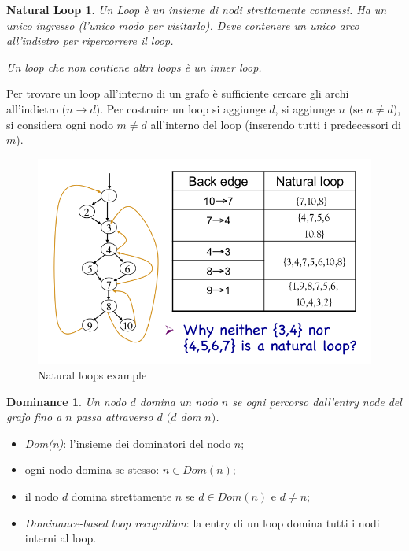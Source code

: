 \documentclass[a4paper, 11pt]{report}
\begin{document}
\newtheorem*{definit5}{Natural Loop}
\begin{definit5}
	Un Loop è un insieme di nodi strettamente connessi. Ha un unico ingresso (l'unico modo per visitarlo). Deve contenere un unico arco all'indietro per ripercorrere il loop.
	
	Un loop che non contiene altri loops è un \textit{inner loop}.
\end{definit5}
\noindent
Per trovare un loop all'interno di un grafo è sufficiente cercare gli archi all'indietro ($n\rightarrow d$).
\newline
Per costruire un loop si aggiunge $d$, si aggiunge $n$ (se $n\neq d$), si considera ogni nodo $m\neq d$ all'interno del loop (inserendo tutti i predecessori di $m$).
\newline

\begin{figure}[H]
	\centering
	\includegraphics[scale=0.27]{NaturalLoop}
	\caption{Natural loops example}
\end{figure}

\newtheorem*{definit6}{Dominance}
\begin{definit6}
	Un nodo $d$ domina un nodo $n$ se ogni percorso dall'entry node del grafo fino a $n$ passa attraverso $d$ $(d$ \textit{dom} $n)$.
\end{definit6}
\begin{itemize}
	\item \textit{Dom(n)}: l'insieme dei dominatori del nodo $n$;
	\item ogni nodo domina se stesso: $n\in Dom(n)$;
	\item il nodo $d$ domina strettamente $n$ se $d\in Dom(n)$ e $d\neq n$;
	\item \textit{Dominance-based loop recognition}: la entry di un loop domina tutti i nodi interni al loop.
\end{itemize}
\end{document}

